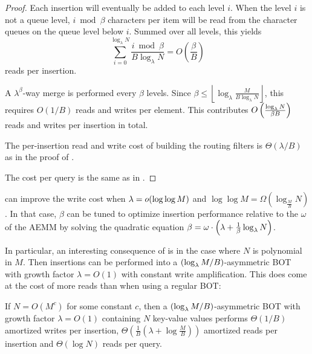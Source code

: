 \asymbot*

\begin{proof}
	Each insertion will eventually be added to each level $i$. When the level
	$i$ is not a queue level, $i\bmod \beta$ characters per item will be read from
	the character queues on the queue level below $i$. Summed over all levels, this
	yields
	\[\sum_{i=0}^{\log_\lambda N} \frac{i\bmod \beta}{B\log_\lambda N} = O\left(\frac{\beta}{B}\right)\]
	reads per insertion.

	A $\lambda^\beta$-way merge is performed every $\beta$ levels. Since $\beta
	\leq \left\lfloor\log_\lambda\frac{M}{B\log_\lambda N}\right\rfloor$, this
	requires $O(1/B)$ reads and writes per element. This contributes
	$O\left(\frac{\log_\lambda{N}}{\beta B}\right)$ reads and writes per
	insertion in total.

	The per-insertion read and write cost of building the routing filters is
	$\Theta(\lambda/B)$ as in the proof of .

	The cost per query is the same as in .
\end{proof}

 can improve the write cost when $\lambda =
o(\log\log M)$ and $\log\log M = \Omega\left(\log_{\frac{M}{B}}{N}\right)$. In
that case, $\beta$ can be tuned to optimize insertion performance relative to
the $\omega$ of the AEMM by solving the quadratic equation $\beta = \omega
\cdot \left(\lambda + \frac{1}{\beta}\log_{\lambda}{N} \right)$. 

In particular, an interesting consequence of  is
in the case where $N$ is polynomial in $M$. Then insertions can be performed
into a $(\log_\lambda{M/B})$-asymmetric BOT with growth factor $\lambda = O(1)$
with constant write amplification. This does come at the cost of more reads
than when using a regular BOT:

\begin{corollary}
        If $N = O(M^c)$ for some constant $c$, then a
        $(\log_\lambda{M/B})$-asymmetric BOT with growth factor $\lambda=O(1)$
        containing $N$ key-value values performs $\Theta(1/B)$ amortized writes
        per insertion, $\Theta\left(\frac{1}{B}\left(\lambda +
        \log{\frac{M}{B}}\right)\right)$ amortized reads per insertion and
        $\Theta(\log N)$ reads per query.
\end{corollary}
